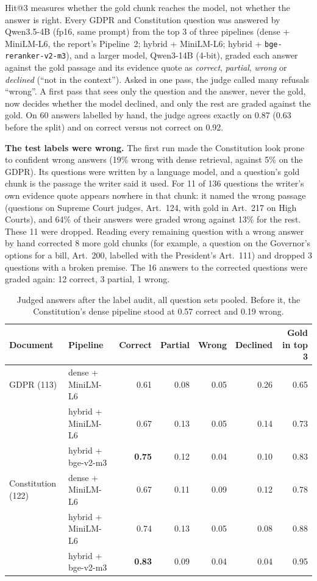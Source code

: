 \documentclass[10pt,a4paper]{article}
\begin{document}
Hit@3 measures whether the gold chunk reaches the model, not whether the answer is right. Every GDPR and
Constitution question was answered by Qwen3.5-4B (fp16, same prompt) from the top 3 of three pipelines (dense +
MiniLM-L6, the report's Pipeline~2; hybrid + MiniLM-L6; hybrid + \texttt{bge-reranker-v2-m3}), and a larger model,
Qwen3-14B (4-bit), graded each answer against the gold passage and its evidence quote as \emph{correct},
\emph{partial}, \emph{wrong} or \emph{declined} (``not in the context''). Asked in one pass, the judge called many
refusals ``wrong''. A first pass that sees only the question and the answer, never the gold, now decides whether
the model declined, and only the rest are graded against the gold. On 60 answers labelled by hand, the judge agrees
exactly on 0.87 (0.63 before the split) and on correct versus not correct on 0.92.

\textbf{The test labels were wrong.} The first run made the Constitution look prone to confident wrong answers
(19\% wrong with dense retrieval, against 5\% on the GDPR). Its questions were written by a language model, and a
question's gold chunk is the passage the writer said it used. For 11 of 136 questions the writer's own evidence
quote appears nowhere in that chunk: it named the wrong passage (questions on Supreme Court judges, Art.~124, with
gold in Art.~217 on High Courts), and 64\% of their answers were graded wrong against 13\% for the rest. These 11
were dropped. Reading every remaining question with a wrong answer by hand corrected 8 more gold chunks (for
example, a question on the Governor's options for a bill, Art.~200, labelled with the President's Art.~111) and
dropped 3 questions with a broken premise. The 16 answers to the corrected questions were graded again: 12 correct,
3 partial, 1 wrong.

\begin{table}[!htbp]
\centering\small
\begin{tabular}{@{}llrrrrr@{}}
\toprule
\textbf{Document} & \textbf{Pipeline} & \textbf{Correct} & \textbf{Partial} & \textbf{Wrong} & \textbf{Declined} & \textbf{Gold in top 3} \\
\midrule
GDPR (113)         & dense + MiniLM-L6  & 0.61 & 0.08 & 0.05 & 0.26 & 0.65 \\
                   & hybrid + MiniLM-L6 & 0.67 & 0.13 & 0.05 & 0.14 & 0.73 \\
                   & hybrid + bge-v2-m3 & \textbf{0.75} & 0.12 & 0.04 & 0.10 & 0.83 \\
\midrule
Constitution (122) & dense + MiniLM-L6  & 0.67 & 0.11 & 0.09 & 0.12 & 0.78 \\
                   & hybrid + MiniLM-L6 & 0.74 & 0.13 & 0.05 & 0.08 & 0.88 \\
                   & hybrid + bge-v2-m3 & \textbf{0.83} & 0.09 & 0.04 & 0.04 & 0.95 \\
\bottomrule
\end{tabular}
\caption{Judged answers after the label audit, all question sets pooled. Before it, the Constitution's dense
pipeline stood at 0.57 correct and 0.19 wrong.}
\end{table}
\end{document}
